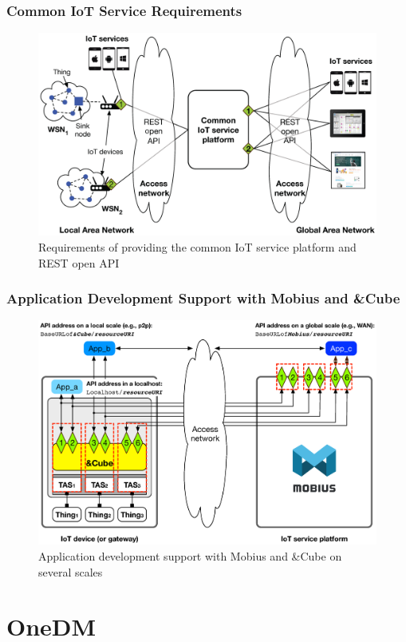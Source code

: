 \documentclass{../iot-lecture}
\begin{document}
\begin{frame}
  \frametitle{Common IoT Service Requirements}
  \begin{figure}
    \includegraphics[width=\textwidth]{./img/iot-common-service-req.png}
    \caption{\scriptsize Requirements of providing the common IoT service platform and REST open API\~\cite{Kim2016}}
  \end{figure}
\end{frame}

\begin{frame}
  \frametitle{Application Development Support with Mobius and \&Cube}
  \begin{figure}
    \includegraphics[width=\textwidth]{./img/mobius-amp-cube-app-dev-support.png}
    \caption{\scriptsize Application development support with Mobius and \&Cube on several scales\~\cite{Kim2016}}
  \end{figure}
\end{frame}

\section{OneDM}

\end{document}
